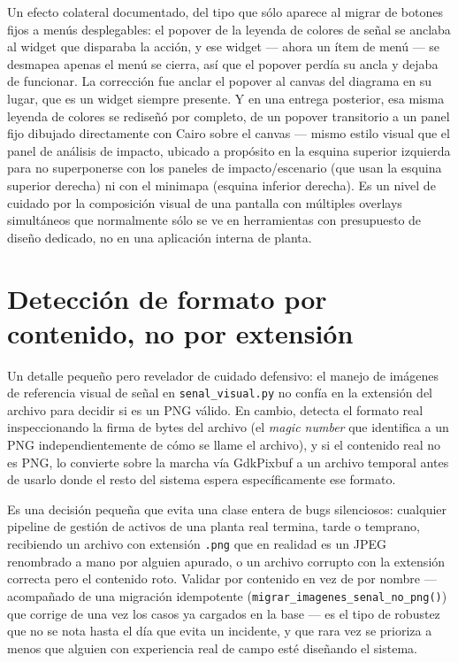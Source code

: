 \documentclass[11pt,twocolumn]{article}
\begin{document}
Un efecto colateral documentado, del tipo que sólo aparece al migrar de botones fijos a menús desplegables: el popover de la leyenda de colores de señal se anclaba al widget que disparaba la acción, y ese widget --- ahora un ítem de menú --- se desmapea apenas el menú se cierra, así que el popover perdía su ancla y dejaba de funcionar. La corrección fue anclar el popover al canvas del diagrama en su lugar, que es un widget siempre presente. Y en una entrega posterior, esa misma leyenda de colores se rediseñó por completo, de un popover transitorio a un panel fijo dibujado directamente con Cairo sobre el canvas --- mismo estilo visual que el panel de análisis de impacto, ubicado a propósito en la esquina superior izquierda para no superponerse con los paneles de impacto/escenario (que usan la esquina superior derecha) ni con el minimapa (esquina inferior derecha). Es un nivel de cuidado por la composición visual de una pantalla con múltiples overlays simultáneos que normalmente sólo se ve en herramientas con presupuesto de diseño dedicado, no en una aplicación interna de planta.

\section{Detección de formato por contenido, no por extensión}

Un detalle pequeño pero revelador de cuidado defensivo: el manejo de imágenes de referencia visual de señal en \texttt{senal\_visual.py} no confía en la extensión del archivo para decidir si es un PNG válido. En cambio, detecta el formato real inspeccionando la firma de bytes del archivo (el \emph{magic number} que identifica a un PNG independientemente de cómo se llame el archivo), y si el contenido real no es PNG, lo convierte sobre la marcha vía GdkPixbuf a un archivo temporal antes de usarlo donde el resto del sistema espera específicamente ese formato.

Es una decisión pequeña que evita una clase entera de bugs silenciosos: cualquier pipeline de gestión de activos de una planta real termina, tarde o temprano, recibiendo un archivo con extensión \texttt{.png} que en realidad es un JPEG renombrado a mano por alguien apurado, o un archivo corrupto con la extensión correcta pero el contenido roto. Validar por contenido en vez de por nombre --- acompañado de una migración idempotente (\texttt{migrar\_imagenes\_senal\_no\_png()}) que corrige de una vez los casos ya cargados en la base --- es el tipo de robustez que no se nota hasta el día que evita un incidente, y que rara vez se prioriza a menos que alguien con experiencia real de campo esté diseñando el sistema.
\end{document}
